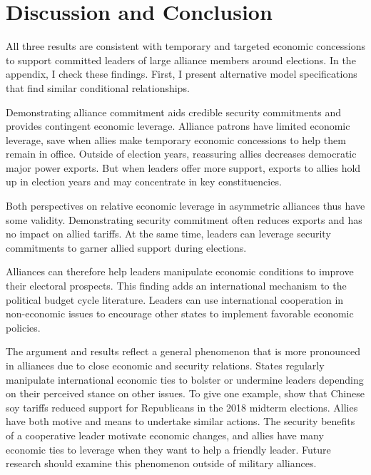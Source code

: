 \documentclass[12pt]{article}
\begin{document}
\section{Discussion and Conclusion}


All three results are consistent with temporary and targeted economic concessions to support committed leaders of large alliance members around elections. 
In the appendix, I check these findings.
First, I present alternative model specifications that find similar conditional relationships.


Demonstrating alliance commitment aids credible security commitments and provides contingent economic leverage. 
Alliance patrons have limited economic leverage, save when allies make temporary economic concessions to help them remain in office. 
Outside of election years, reassuring allies decreases democratic major power exports.
But when leaders offer more support, exports to allies hold up in election years and may concentrate in key constituencies.


Both perspectives on relative economic leverage in asymmetric alliances thus have some validity. 
Demonstrating security commitment often reduces exports and has no impact on allied tariffs. 
At the same time, leaders can leverage security commitments to garner allied support during elections. 


Alliances can therefore help leaders manipulate economic conditions to improve their electoral prospects. 
This finding adds an international mechanism to the political budget cycle literature.
Leaders can use international cooperation in non-economic issues to encourage other states to implement favorable economic policies. 


The argument and results reflect a general phenomenon that is more pronounced in alliances due to close economic and security relations. 
States regularly manipulate international economic ties to bolster or undermine leaders depending on their perceived stance on other issues. 
To give one example, \citet{ChyzhUrbatsch2021} show that Chinese soy tariffs reduced support for Republicans in the 2018 midterm elections. 
Allies have both motive and means to undertake similar actions. 
The security benefits of a cooperative leader motivate economic changes, and allies have many economic ties to leverage when they want to help a friendly leader. 
Future research should examine this phenomenon outside of military alliances.
\end{document}
